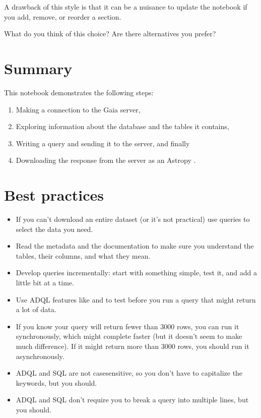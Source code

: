 \documentclass[letterpaper,10pt,english]{sphinxmanual}
\begin{document}
A drawback of this style is that it can be a nuisance to update the notebook if you add, remove, or reorder a section.

What do you think of this choice?  Are there alternatives you prefer?


\section{Summary}
\label{\detokenize{01_query:summary}}
This notebook demonstrates the following steps:
\begin{enumerate}
%
\item {} 
Making a connection to the Gaia server,

\item {} 
Exploring information about the database and the tables it contains,

\item {} 
Writing a query and sending it to the server, and finally

\item {} 
Downloading the response from the server as an Astropy .

\end{enumerate}


\section{Best practices}
\label{\detokenize{01_query:best-practices}}\begin{itemize}
\item {} 
If you can’t download an entire dataset (or it’s not practical) use queries to select the data you need.

\item {} 
Read the metadata and the documentation to make sure you understand the tables, their columns, and what they mean.

\item {} 
Develop queries incrementally: start with something simple, test it, and add a little bit at a time.

\item {} 
Use ADQL features like  and  to test before you run a query that might return a lot of data.

\item {} 
If you know your query will return fewer than 3000 rows, you can run it synchronously, which might complete faster (but it doesn’t seem to make much difference).  If it might return more than 3000 rows, you should run it asynchronously.

\item {} 
ADQL and SQL are not case\sphinxhyphen{}sensitive, so you don’t have to capitalize the keywords, but you should.

\item {} 
ADQL and SQL don’t require you to break a query into multiple lines, but you should.

\end{itemize}
\end{document}
